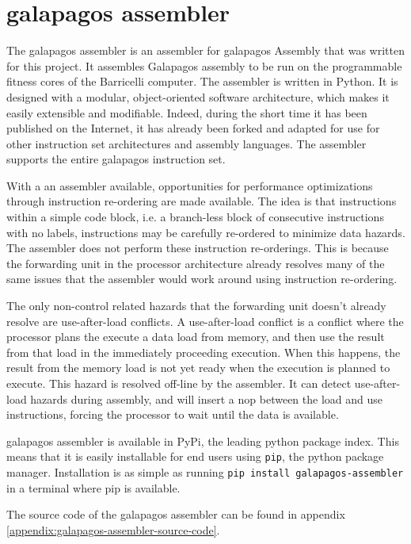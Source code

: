\section{\Gls{galapagos assembler}}

The \Gls{galapagos assembler} is an assembler for \Gls{galapagos} Assembly that was written for this project.
It assembles Galapagos assembly to be run on the programmable fitness cores of the Barricelli computer.
The assembler is written in Python. 
It is designed with a modular, object-oriented software architecture, which makes it easily extensible and modifiable.
Indeed, during the short time it has been published on the Internet, it has already been forked and adapted for use for other instruction set architectures and assembly languages.
The assembler supports the entire \Gls{galapagos} instruction set.

With a an assembler available, opportunities for performance optimizations through instruction re-ordering are made available.
The idea is that instructions within a simple code block, i.e. a branch-less block of consecutive instructions with no labels, instructions may be carefully re-ordered to minimize data hazards.
The assembler does not perform these instruction re-orderings.
This is because the forwarding unit in the processor architecture already resolves many of the same issues that the assembler would work around using instruction re-ordering.

The only non-control related hazards that the forwarding unit doesn't already resolve are use-after-load conflicts.
A use-after-load conflict is a conflict where the processor plans the execute a data load from memory, and then use the result from that load in the immediately proceeding execution.
When this happens, the result from the memory load is not yet ready when the execution is planned to execute.
This hazard is resolved off-line by the assembler.
It can detect use-after-load hazards during assembly, and will insert a \gls{nop} between the load and use instructions, forcing the processor to wait until the data is available.

\Gls{galapagos assembler} is available in PyPi, the leading python package index.
This means that it is easily installable for end users using \texttt{pip}, the python package manager.
Installation is as simple as running \texttt{pip install galapagos-assembler} in a terminal where pip is available.

The source code of the \Gls{galapagos assembler} can be found in appendix \vref{appendix:galapagos-assembler-source-code}.

